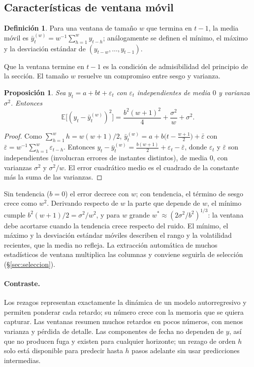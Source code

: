 \documentclass[11pt,a4paper]{article}
\theoremstyle{plain}
\newtheorem{proposicion}[teorema]{Proposición}
\theoremstyle{definition}
\newtheorem{definicion}[teorema]{Definición}
\theoremstyle{remark}
\newcommand{\E}{\mathbb{E}}
\newcommand{\1}{\mathbf{1}}
\begin{document}
\subsection{Características de ventana móvil}

\begin{definicion}
Para una ventana de tamaño $w$ que termina en $t-1$, la media móvil es
$\bar y^{(w)}_t=w^{-1}\sum_{h=1}^wy_{t-h}$; análogamente se definen el
mínimo, el máximo y la desviación estándar de $(y_{t-w},\dots,y_{t-1})$.
\end{definicion}

Que la ventana termine en $t-1$ es la condición de admisibilidad del
principio de la sección. El tamaño $w$ resuelve un compromiso entre sesgo
y varianza.

\begin{proposicion}\label{prop:ventana}
Sea $y_t=a+bt+\varepsilon_t$ con $\varepsilon_t$ independientes de media
$0$ y varianza $\sigma^2$. Entonces
\[
\E\bigl[(y_t-\bar y^{(w)}_t)^2\bigr]=\frac{b^2(w+1)^2}{4}+\frac{\sigma^2}w+\sigma^2 .
\]
\end{proposicion}

\begin{proof}
Como $\sum_{h=1}^wh=w(w+1)/2$,
$\bar y^{(w)}_t=a+b\bigl(t-\frac{w+1}2\bigr)+\bar\varepsilon$ con
$\bar\varepsilon=w^{-1}\sum_{h=1}^w\varepsilon_{t-h}$. Entonces
$y_t-\bar y^{(w)}_t=\frac{b(w+1)}2+\varepsilon_t-\bar\varepsilon$, donde
$\varepsilon_t$ y $\bar\varepsilon$ son independientes (involucran
errores de instantes distintos), de media $0$, con varianzas $\sigma^2$ y
$\sigma^2/w$. El error cuadrático medio es el cuadrado de la constante más
la suma de las varianzas.
\end{proof}

Sin tendencia ($b=0$) el error decrece con $w$; con tendencia, el término
de sesgo crece como $w^2$. Derivando respecto de $w$ la parte que depende
de $w$, el mínimo cumple $b^2(w+1)/2=\sigma^2/w^2$, y para $w$ grande
$w^*\approx(2\sigma^2/b^2)^{1/3}$: la ventana debe acortarse cuando la
tendencia crece respecto del ruido. El mínimo, el máximo y la desviación
estándar móviles describen el rango y la volatilidad recientes, que la
media no refleja. La extracción automática de muchos estadísticos de
ventana multiplica las columnas y conviene seguirla de selección
(\S\ref{sec:seleccion}).

\paragraph{Contraste.} Los rezagos representan exactamente la dinámica de
un modelo autorregresivo y permiten ponderar cada retardo; su número
crece con la memoria que se quiera capturar. Las ventanas resumen muchos
retardos en pocos números, con menos varianza y pérdida de detalle. Las
componentes de fecha no dependen de $y$, así que no producen fuga y existen
para cualquier horizonte; un rezago de orden $h$ solo está disponible
para predecir hasta $h$ pasos adelante sin usar predicciones intermedias.
\end{document}
